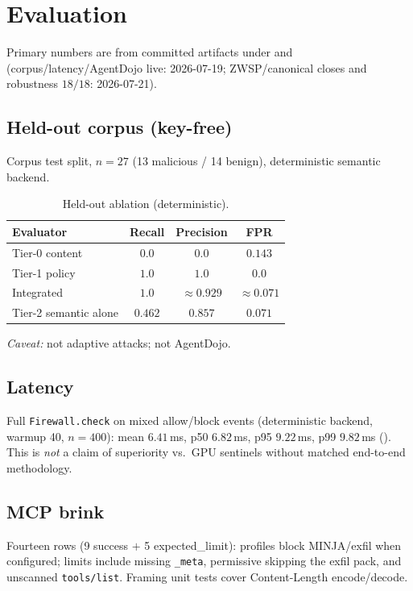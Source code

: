 \documentclass[conference]{IEEEtran}
\begin{document}
\section{Evaluation}

Primary numbers are from committed artifacts under 
and  (corpus/latency/AgentDojo live: 2026-07-19;
ZWSP/canonical closes and robustness $18/18$: 2026-07-21).

\subsection{Held-out corpus (key-free)}
Corpus  test split, $n{=}27$ (13 malicious / 14 benign),
deterministic semantic backend.

\begin{table}[!t]
\centering
\caption{Held-out ablation (deterministic).}
\label{tab:heldout}
\begin{tabular}{@{}lccc@{}}
\toprule
Evaluator & Recall & Precision & FPR \\
\midrule
Tier-0 content & $0.0$ & $0.0$ & $0.143$ \\
Tier-1 policy & $1.0$ & $1.0$ & $0.0$ \\
Integrated & $1.0$ & $\approx0.929$ & $\approx0.071$ \\
Tier-2 semantic alone & $0.462$ & $0.857$ & $0.071$ \\
\bottomrule
\end{tabular}
\end{table}
\noindent\emph{Caveat:} not adaptive attacks; not AgentDojo.

\subsection{Latency}
Full \texttt{Firewall.check} on mixed allow/block events (deterministic backend,
warmup 40, $n{=}400$): mean $6.41$\,ms, p50 $6.82$\,ms, p95 $9.22$\,ms, p99 $9.82$\,ms
(). This is \emph{not} a claim of superiority vs.\ GPU
sentinels without matched end-to-end methodology.

\subsection{MCP brink}
Fourteen rows (9 success $+$ 5 expected\_limit): profiles block MINJA/exfil when configured;
limits include missing \texttt{\_meta}, permissive skipping the exfil pack, and unscanned
\texttt{tools/list}. Framing unit tests cover Content-Length encode/decode.
\end{document}
